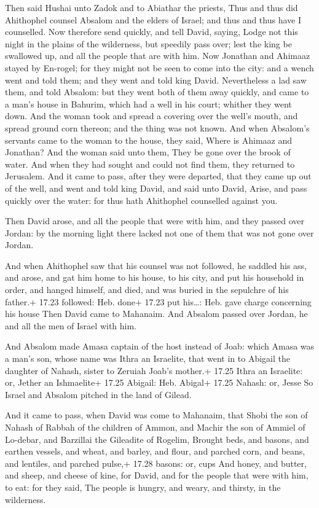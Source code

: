  Then said Hushai unto Zadok and to Abiathar the priests,
Thus and thus did Ahithophel counsel Absalom and the elders of Israel;
and thus and thus have I counselled.  Now therefore send
quickly, and tell David, saying, Lodge not this night in the plains of
the wilderness, but speedily pass over; lest the king be swallowed up,
and all the people that are with him.  Now Jonathan and
Ahimaaz stayed by En-rogel; for they might not be seen to come into the
city: and a wench went and told them; and they went and told king David.
 Nevertheless a lad saw them, and told Absalom: but they
went both of them away quickly, and came to a man's house in Bahurim,
which had a well in his court; whither they went down.  And
the woman took and spread a covering over the well's mouth, and spread
ground corn thereon; and the thing was not known.  And when
Absalom's servants came to the woman to the house, they said, Where is
Ahimaaz and Jonathan? And the woman said unto them, They be gone over
the brook of water. And when they had sought and could not find them,
they returned to Jerusalem.  And it came to pass, after
they were departed, that they came up out of the well, and went and told
king David, and said unto David, Arise, and pass quickly over the water:
for thus hath Ahithophel counselled against you.

 Then David arose, and all the people that were with him,
and they passed over Jordan: by the morning light there lacked not one
of them that was not gone over Jordan.

 And when Ahithophel saw that his counsel was not
followed, he saddled his ass, and arose, and gat him home to his house,
to his city, and put his household in order, and hanged himself, and
died, and was buried in the sepulchre of his father.+ 17.23 followed:
Heb. done+ 17.23 put his\ldots: Heb. gave charge concerning his house
 Then David came to Mahanaim. And Absalom passed over
Jordan, he and all the men of Israel with him.

 And Absalom made Amasa captain of the host instead of
Joab: which Amasa was a man's son, whose name was Ithra an Israelite,
that went in to Abigail the daughter of Nahash, sister to Zeruiah Joab's
mother.+ 17.25 Ithra an Israelite: or, Jether an Ishmaelite+ 17.25
Abigail: Heb. Abigal+ 17.25 Nahash: or, Jesse  So Israel
and Absalom pitched in the land of Gilead.

 And it came to pass, when David was come to Mahanaim,
that Shobi the son of Nahash of Rabbah of the children of Ammon, and
Machir the son of Ammiel of Lo-debar, and Barzillai the Gileadite of
Rogelim,  Brought beds, and basons, and earthen vessels,
and wheat, and barley, and flour, and parched corn, and beans, and
lentiles, and parched pulse,+ 17.28 basons: or, cups  And
honey, and butter, and sheep, and cheese of kine, for David, and for the
people that were with him, to eat: for they said, The people is hungry,
and weary, and thirsty, in the wilderness.

